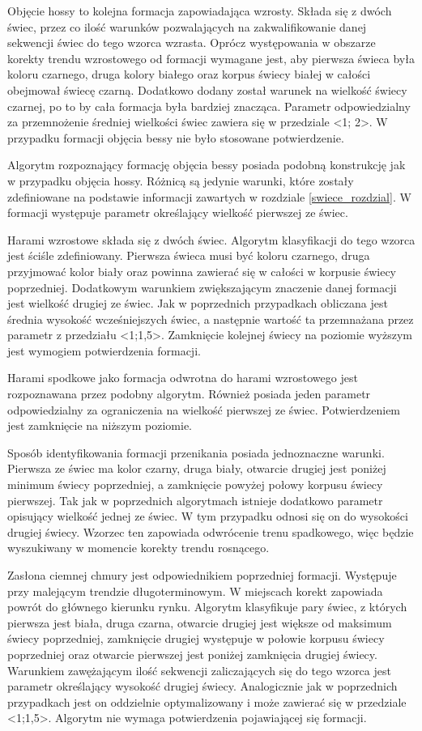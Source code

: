 \documentclass[pdflatex,11pt]{aghdpl}
\begin{document}
Objęcie hossy to kolejna formacja zapowiadająca wzrosty. Składa się z dwóch świec, przez co ilość warunków pozwalających na zakwalifikowanie danej sekwencji świec do tego wzorca wzrasta. Oprócz występowania w obszarze korekty trendu wzrostowego od formacji wymagane jest, aby pierwsza świeca była koloru czarnego, druga kolory białego oraz korpus świecy białej w całości obejmował świecę czarną. Dodatkowo dodany został warunek na wielkość świecy czarnej, po to by cała formacja była bardziej znacząca. Parametr odpowiedzialny za przemnożenie średniej wielkości świec  zawiera się w przedziale <1; 2>. W przypadku formacji objęcia bessy nie było stosowane potwierdzenie.

Algorytm rozpoznający formację objęcia bessy posiada podobną konstrukcję jak w przypadku objęcia hossy. Różnicą są jedynie warunki, które zostały zdefiniowane na podstawie informacji zawartych w rozdziale \ref{swiece_rozdzial}. W formacji występuje parametr określający wielkość pierwszej ze świec.

Harami wzrostowe składa się z dwóch świec. Algorytm klasyfikacji do tego wzorca jest ściśle zdefiniowany. Pierwsza świeca musi być koloru czarnego, druga przyjmować kolor biały oraz powinna zawierać się w całości w korpusie świecy poprzedniej. Dodatkowym warunkiem zwiększającym znaczenie danej formacji jest wielkość drugiej ze świec. Jak w poprzednich przypadkach obliczana jest średnia wysokość wcześniejszych świec, a następnie wartość ta przemnażana przez parametr z przedziału <1;1,5>. Zamknięcie kolejnej świecy na poziomie wyższym jest wymogiem potwierdzenia formacji.

Harami spodkowe jako formacja odwrotna do harami wzrostowego jest rozpoznawana przez podobny algorytm. Również posiada jeden parametr odpowiedzialny za ograniczenia na wielkość pierwszej ze świec. Potwierdzeniem jest zamknięcie na niższym poziomie.

Sposób identyfikowania formacji przenikania posiada jednoznaczne warunki. Pierwsza ze świec ma kolor czarny, druga biały, otwarcie drugiej jest poniżej minimum świecy poprzedniej, a zamknięcie powyżej połowy korpusu świecy pierwszej. Tak jak w poprzednich algorytmach istnieje dodatkowo parametr opisujący wielkość jednej ze świec. W tym przypadku odnosi się on do wysokości drugiej świecy. Wzorzec ten zapowiada odwrócenie trenu spadkowego, więc będzie wyszukiwany w momencie korekty trendu rosnącego.

Zasłona ciemnej chmury jest odpowiednikiem poprzedniej formacji. Występuje przy malejącym trendzie długoterminowym. W miejscach korekt zapowiada powrót do głównego kierunku rynku. Algorytm klasyfikuje pary świec, z których pierwsza jest biała, druga czarna, otwarcie drugiej jest większe od maksimum świecy poprzedniej, zamknięcie drugiej występuje w połowie korpusu świecy poprzedniej oraz otwarcie pierwszej jest poniżej zamknięcia drugiej świecy. Warunkiem zawężającym ilość sekwencji zaliczających się do tego wzorca jest parametr określający wysokość drugiej świecy. Analogicznie jak w poprzednich przypadkach jest on oddzielnie optymalizowany i może zawierać się w przedziale <1;1,5>. Algorytm nie wymaga potwierdzenia pojawiającej się formacji.
\end{document}
